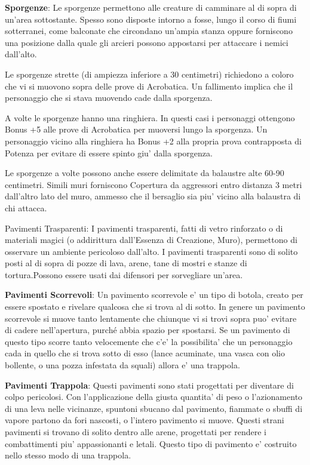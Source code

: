 \documentclass[a4paper,11pt,twoside,openany]{dndbook}
\begin{document}
\textbf{Sporgenze}: Le sporgenze permettono alle creature di camminare al di sopra di un'area sottostante. Spesso sono disposte intorno a fosse, lungo il corso di fiumi sotterranei, come balconate che circondano un'ampia stanza oppure forniscono una posizione dalla quale gli arcieri possono appostarsi per attaccare i nemici dall'alto. 

Le sporgenze strette (di ampiezza inferiore a 30 centimetri) richiedono a coloro che vi si muovono sopra delle prove di Acrobatica. Un fallimento implica che il personaggio che si stava muovendo cade dalla sporgenza.

A volte le sporgenze hanno una ringhiera. In questi casi i personaggi ottengono Bonus +5 alle prove di Acrobatica per muoversi lungo la sporgenza. Un personaggio vicino alla ringhiera ha Bonus +2 alla propria prova contrapposta di Potenza per evitare di essere spinto giu' dalla sporgenza. 

Le sporgenze a volte possono anche essere delimitate da balaustre alte 60-90 centimetri. Simili muri forniscono Copertura da aggressori entro distanza 3 metri dall'altro lato del muro, ammesso che il bersaglio sia piu' vicino alla balaustra di chi attacca.

Pavimenti Trasparenti: I pavimenti trasparenti, fatti di vetro rinforzato o di materiali magici (o addirittura dall'Essenza di Creazione, Muro), permettono di osservare un ambiente pericoloso dall'alto. I pavimenti trasparenti sono di solito posti al di sopra di pozze di lava, arene, tane di mostri e stanze di tortura.Possono essere usati dai difensori 
per sorvegliare un'area.

\textbf{Pavimenti Scorrevoli}: Un pavimento scorrevole e' un tipo di botola, creato per essere spostato e rivelare qualcosa che si trova al di sotto. In genere un pavimento scorrevole si muove tanto lentamente che chiunque vi si trovi sopra puo' evitare di cadere nell'apertura, purché abbia spazio per spostarsi. Se un pavimento di questo tipo scorre tanto velocemente che c'e' la possibilita' che un personaggio cada in quello che si trova sotto di esso (lance acuminate, una vasca con olio bollente, o una pozza infestata da squali) allora e' una trappola.

\textbf{Pavimenti Trappola}: Questi pavimenti sono stati progettati per diventare di colpo pericolosi. Con l'applicazione della giusta quantita' di peso o l'azionamento di una leva nelle vicinanze, spuntoni sbucano dal pavimento, fiammate o sbuffi di vapore partono da fori nascosti, o l'intero pavimento si muove. Questi strani pavimenti si trovano di solito dentro alle arene, progettati per rendere i combattimenti piu' appassionanti e letali. Questo tipo di pavimento e' costruito nello stesso modo di una trappola.
\end{document}
